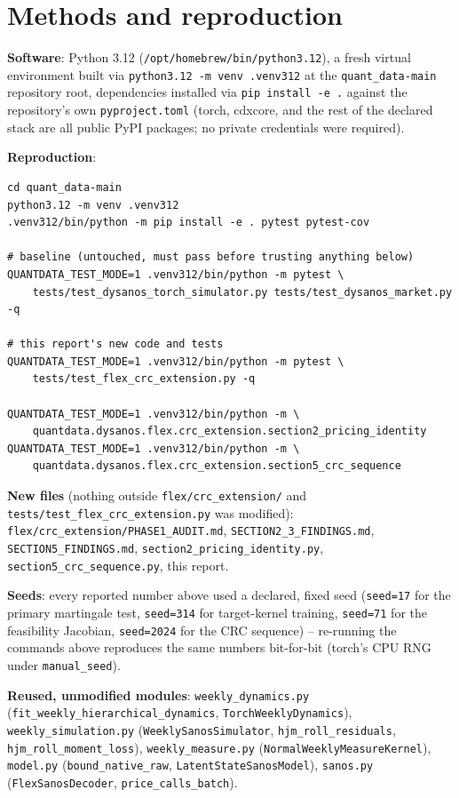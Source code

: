 \section{Methods and reproduction}
\label{sec:methods}

\textbf{Software}: Python 3.12 (\texttt{/opt/homebrew/bin/python3.12}), a
fresh virtual environment built via \texttt{python3.12 -m venv .venv312} at
the \texttt{quant\_data-main} repository root, dependencies installed via
\texttt{pip install -e .} against the repository's own
\texttt{pyproject.toml} (torch, cdxcore, and the rest of the declared stack
are all public PyPI packages; no private credentials were required).

\textbf{Reproduction}:
\begin{verbatim}
cd quant_data-main
python3.12 -m venv .venv312
.venv312/bin/python -m pip install -e . pytest pytest-cov

# baseline (untouched, must pass before trusting anything below)
QUANTDATA_TEST_MODE=1 .venv312/bin/python -m pytest \
    tests/test_dysanos_torch_simulator.py tests/test_dysanos_market.py -q

# this report's new code and tests
QUANTDATA_TEST_MODE=1 .venv312/bin/python -m pytest \
    tests/test_flex_crc_extension.py -q

QUANTDATA_TEST_MODE=1 .venv312/bin/python -m \
    quantdata.dysanos.flex.crc_extension.section2_pricing_identity
QUANTDATA_TEST_MODE=1 .venv312/bin/python -m \
    quantdata.dysanos.flex.crc_extension.section5_crc_sequence
\end{verbatim}

\textbf{New files} (nothing outside \texttt{flex/crc\_extension/} and
\texttt{tests/test\_flex\_crc\_extension.py} was modified):
\texttt{flex/crc\_extension/PHASE1\_AUDIT.md},
\texttt{SECTION2\_3\_FINDINGS.md}, \texttt{SECTION5\_FINDINGS.md},
\texttt{section2\_pricing\_identity.py}, \texttt{section5\_crc\_sequence.py},
this report.

\textbf{Seeds}: every reported number above used a declared, fixed seed
(\texttt{seed=17} for the primary martingale test, \texttt{seed=314} for
target-kernel training, \texttt{seed=71} for the feasibility Jacobian,
\texttt{seed=2024} for the CRC sequence) -- re-running the commands above
reproduces the same numbers bit-for-bit (torch's CPU RNG under
\texttt{manual\_seed}).

\textbf{Reused, unmodified modules}: \texttt{weekly\_dynamics.py}
(\texttt{fit\_weekly\_hierarchical\_dynamics}, \texttt{TorchWeeklyDynamics}),
\texttt{weekly\_simulation.py} (\texttt{WeeklySanosSimulator},
\texttt{hjm\_roll\_residuals}, \texttt{hjm\_roll\_moment\_loss}),
\texttt{weekly\_measure.py} (\texttt{NormalWeeklyMeasureKernel}),
\texttt{model.py} (\texttt{bound\_native\_raw}, \texttt{LatentStateSanosModel}),
\texttt{sanos.py} (\texttt{FlexSanosDecoder}, \texttt{price\_calls\_batch}).
